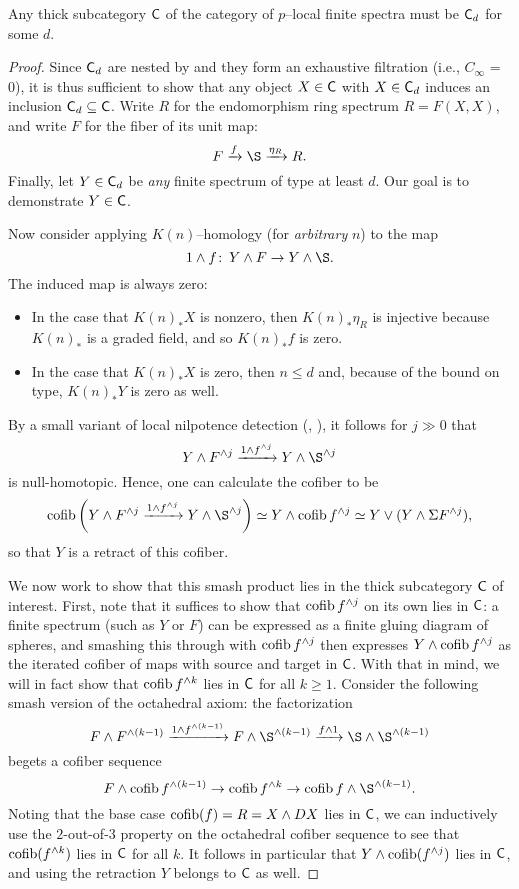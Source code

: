\begin{theorem}\label{ThickSubcatClassification}
Any thick subcategory $\mathsf{C}$ of the category of $p$--local finite spectra must be $\mathsf{C}_d$ for some $d$.
\end{theorem}
\begin{proof}
Since $\mathsf{C}_d$ are nested by  and they form an exhaustive filtration (i.e., $C_\infty$ = 0), it is thus sufficient to show that any object $X \in \mathsf{C}$ with $X \in \mathsf{C}_d$ induces an inclusion $\mathsf{C}_d \subseteq \mathsf{C}$.  Write $R$ for the endomorphism ring spectrum $R = F(X, X)$, and write $F$ for the fiber of its unit map: \[F \xrightarrow{f} \S \xrightarrow{\eta_R} R.\]  Finally, let $Y \in \mathsf{C}_d$ be \emph{any} finite spectrum of type at least $d$.  Our goal is to demonstrate $Y \in \mathsf{C}$.  

Now consider applying $K(n)$--homology (for \emph{arbitrary} $n$) to the map \[1 \sm f\co Y \sm F \to Y \sm \S.\]  The induced map is always zero:
\begin{itemize}
\item In the case that $K(n)_* X$ is nonzero, then $K(n)_* \eta_R$ is injective because $K(n)_*$ is a graded field, and so $K(n)_* f$ is zero.
\item In the case that $K(n)_* X$ is zero, then $n \le d$ and, because of the bound on type, $K(n)_* Y$ is zero as well.
\end{itemize}
By a small variant of local nilpotence detection (, \cite[Corollary 2.5]{HopkinsSmith}), it follows for $j \gg 0$ that \[Y \sm F^{\sm j} \xrightarrow{1 \sm f^{\sm j}} Y \sm \S^{\sm j}\] is null-homotopic.  Hence, one can calculate the cofiber to be \[\cofib\left( Y \sm F^{\sm j} \xrightarrow{1 \sm f^{\sm j}} Y \sm \S^{\sm j} \right) \simeq Y \sm \cofib f^{\sm j} \simeq Y \vee (Y \sm \Susp F^{\sm j}),\] so that $Y$ is a retract of this cofiber.

We now work to show that this smash product lies in the thick subcategory $\mathsf{C}$ of interest.  First, note that it suffices to show that $\operatorname{cofib} f^{\wedge j}$ on its own lies in $\mathsf{C}$: a finite spectrum (such as $Y$ or $F$) can be expressed as a finite gluing diagram of spheres, and smashing this through with $\operatorname{cofib} f^{\wedge j}$ then expresses $Y \wedge \operatorname{cofib} f^{\wedge j}$ as the iterated cofiber of maps with source and target in $\mathsf{C}$.  With that in mind, we will in fact show that $\operatorname{cofib} f^{\wedge k}$ lies in $\mathsf{C}$ for all $k \ge 1$.  Consider the following smash version of the octahedral axiom: the factorization \[F \sm F^{\sm (k-1)} \xrightarrow{1 \sm f^{\sm (k-1)}} F \sm \S^{\sm (k-1)} \xrightarrow{f \sm 1} \S \sm \S^{\sm (k-1)}\] begets a cofiber sequence \[F \sm \cofib f^{\sm (k-1)} \to \cofib f^{\sm k} \to \cofib f \sm \S^{\sm (k-1)}.\]  Noting that the base case $\operatorname{cofib}(f) = R = X \wedge DX$ lies in $\mathsf{C}$, we can inductively use the $2$-out-of-$3$ property on the octahedral cofiber sequence to see that $\operatorname{cofib}(f^{\wedge k})$ lies in $\mathsf{C}$ for all $k$.  It follows in particular that $Y \wedge \operatorname{cofib}(f^{\wedge j})$ lies in $\mathsf{C}$, and using the retraction $Y$ belongs to $\mathsf{C}$ as well.
\end{proof}


